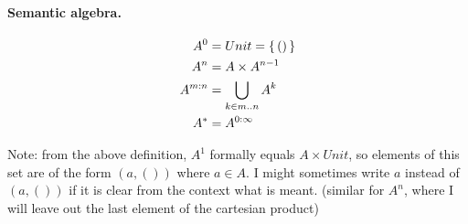 \begin{defbox}
\paragraph{Semantic algebra.}
\begin{align*}
A^0 &= Unit = \left\{\,()\,\right\} \\
A^n &= A \times A^{n-1} \\
A^{m:n} &= \bigcup_{k \in m..n} A^k \\
A^{*} &= A^{0:\infty}
\end{align*}

Note: from the above definition, $A^1$ formally equals $A \times Unit$, so elements of this set are of the form $(a, ())$ where $a \in A$. I might sometimes write $a$ instead of $(a, ())$ if it is clear from the context what is meant. (similar for $A^n$, where I will leave out the last element of the cartesian product)


\end{defbox}
